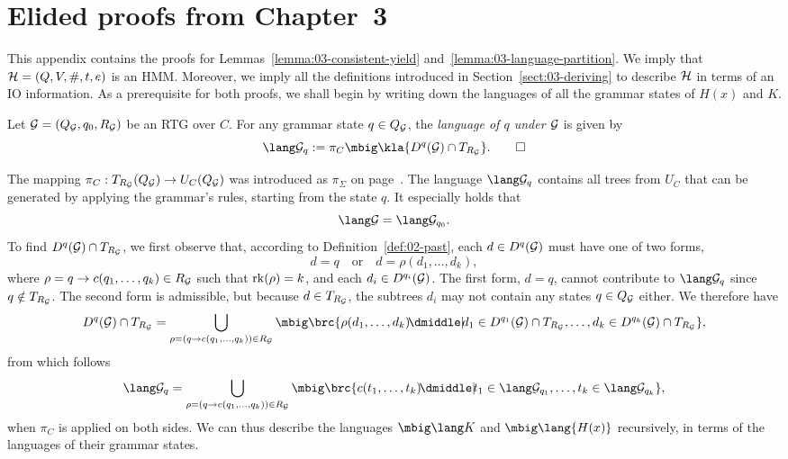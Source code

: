 \section{Elided proofs from Chapter~3}\label{sec:appendix-hk-proofs}

This appendix contains the proofs for Lemmas~\ref{lemma:03-consistent-yield}
and~\ref{lemma:03-language-partition}. We imply that $\mathcal H = (Q,V,\#,t,e)$ is an
HMM. Moreover, we imply all the definitions introduced in
Section~\ref{sect:03-deriving} to describe $\mathcal H$ in terms of an IO information.
As a prerequisite for both proofs, we shall begin by writing down the languages
of all the grammar states of $H(x)$ and $K$.

\begin{definition}
 Let $\mathcal G = (Q_\mathcal G,q_0,R_\mathcal G)$ be an RTG over $C$. For any grammar state $q\in
 Q_\mathcal G$, the \emph{language of $q$ under $\mathcal G$} is given by
 \[
  \lang\ug_q := \pi_C\mbig\kla{D^q(\ug)\cap T_{R_\ug}}.
  \qedhere
 \]
\end{definition}

The mapping $\pi_C:T_{R_\mathcal G}(Q_\mathcal G)\to U_C(Q_\mathcal G)$ was introduced as $\pi_\Sigma$ on
page~\pageref{def:02-pi-sigma}. The language $\lang\ug_q$ contains all trees
from $U_C$ that can be generated by applying the grammar's rules, starting from
the state $q$. It especially holds that
\begin{equation}\label{eq:a1}
 \lang\ug = \lang\ug_{q_0}.
\end{equation}
To find $D^q(\mathcal G)\cap T_{R_\mathcal G}$, we first observe that, according to
Definition~\ref{def:02-past}, each $d\in D^q(\mathcal G)$ must have one of two forms,
\[
 d = q \quad\text{or}\quad d = \rho(d_1,\ldots,d_k),
\]
where $\rho=q\to c(q_1,\ldots,q_k)\in R_\mathcal G$ such that $\operatorname{rk}(\rho) = k$, and
each $d_i\in D^{q_i}(\mathcal G)$. The first form, $d = q$, cannot contribute to
$\lang\ug_q$ since $q\notin T_{R_\mathcal G}$. The second form is admissible, but
because $d\in T_{R_\mathcal G}$, the subtrees $d_i$ may not contain any states $q\in
Q_\mathcal G$ either. We therefore have
\[
 D^q(\ug)\cap T_{R_\ug} = \bigcup_{\rho=(q\to c(q_1,\ldots,q_k))\in R_\ug}
 \mbig\brc{\rho(d_1,\ldots,d_k) \!\dmiddle|\! d_1\in D^{q_1}(\ug)\cap T_{R_\ug},\ldots, d_k\in D^{q_k}(\ug)\cap T_{R_\ug}},
\]
from which follows
\begin{equation}
 \label{eq:a2}
 \lang\ug_q = \bigcup_{\rho=(q\to c(q_1,\ldots,q_k))\in R_\ug}
 \mbig\brc{c(t_1,\ldots,t_k) \!\dmiddle|\! t_1\in\lang\ug_{q_1},\ldots, t_k\in\lang\ug_{q_k}},
\end{equation}
when $\pi_C$ is applied on both sides. We can thus describe the languages
$\mbig\lang K$ and $\mbig\lang{H(x)}$ recursively, in terms of the languages of
their grammar states.

